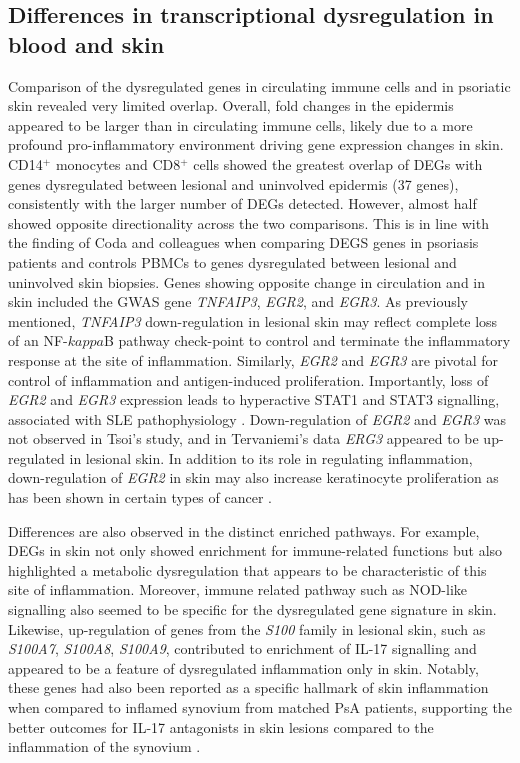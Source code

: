 \subsection{Differences in transcriptional dysregulation in blood and skin}
Comparison of the dysregulated genes in circulating immune cells and in psoriatic skin revealed very limited overlap.  Overall, fold changes in the epidermis appeared to be larger than in circulating immune cells, likely due to a more profound pro-inflammatory environment driving gene expression changes in skin. CD14$^+$ monocytes and CD8$^+$ cells showed the greatest overlap of DEGs with genes dysregulated between lesional and uninvolved epidermis (37 genes), consistently with the larger number of DEGs detected. However, almost half showed opposite directionality across the two comparisons. This is in line with the finding of Coda and colleagues when comparing DEGS genes in psoriasis patients and controls PBMCs to genes dysregulated between lesional and uninvolved skin biopsies. 
Genes showing opposite change in circulation and in skin included the GWAS gene \textit{TNFAIP3}, \textit{EGR2}, and \textit{EGR3}. As previously mentioned, \textit{TNFAIP3} down-regulation in lesional skin may reflect complete loss of an NF-$kappa$B pathway check-point to control and terminate the inflammatory response at the site of inflammation. Similarly, \textit{EGR2} and \textit{EGR3} are pivotal for control of inflammation and antigen-induced proliferation. Importantly, loss of \textit{EGR2} and \textit{EGR3} expression leads to hyperactive STAT1 and STAT3 signalling, associated with SLE pathophysiology \parencite{Li2012}. Down-regulation of \textit{EGR2} and \textit{EGR3} was not observed in Tsoi’s study, and in Tervaniemi’s data \textit{ERG3} appeared to be up-regulated in lesional skin. In addition to its role in regulating inflammation, down-regulation of \textit{EGR2} in skin may also increase keratinocyte proliferation as has been shown in certain types of cancer \parencite{Wu2010}.


Differences are also observed in the distinct enriched pathways. For example, DEGs in skin not only showed enrichment for immune-related functions but also highlighted a metabolic dysregulation that appears to be characteristic of this site of inflammation. Moreover, immune related pathway such as NOD-like signalling also seemed to be specific for the dysregulated gene signature in skin. Likewise, up-regulation of genes from the \textit{S100} family in lesional skin, such as \textit{S100A7}, \textit{S100A8}, \textit{S100A9}, contributed to enrichment of IL-17 signalling and appeared to be a feature of dysregulated inflammation only in skin. Notably, these genes had also been reported as a specific hallmark of skin inflammation when compared to inflamed synovium from matched PsA patients, supporting the better outcomes for IL-17 antagonists in skin lesions compared to the inflammation of the synovium \parencite{Belasco2015}.



